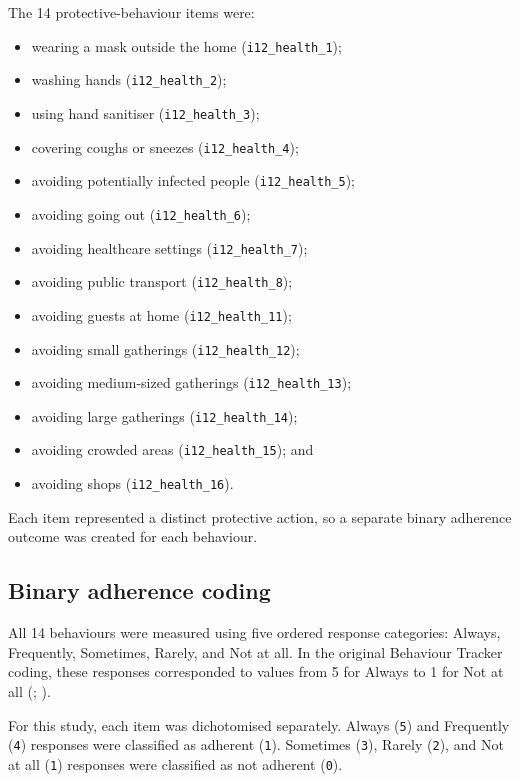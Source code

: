 \documentclass[
  12pt,
  a4paper,
]{article}
\providecommand{\tightlist}{%
  \setlength{\itemsep}{0pt}\setlength{\parskip}{0pt}}
\begin{document}
The 14 protective-behaviour items were:

\begin{itemize}
\tightlist
\item
  wearing a mask outside the home (\texttt{i12\_health\_1});
\item
  washing hands (\texttt{i12\_health\_2});
\item
  using hand sanitiser (\texttt{i12\_health\_3});
\item
  covering coughs or sneezes (\texttt{i12\_health\_4});
\item
  avoiding potentially infected people (\texttt{i12\_health\_5});
\item
  avoiding going out (\texttt{i12\_health\_6});
\item
  avoiding healthcare settings (\texttt{i12\_health\_7});
\item
  avoiding public transport (\texttt{i12\_health\_8});
\item
  avoiding guests at home (\texttt{i12\_health\_11});
\item
  avoiding small gatherings (\texttt{i12\_health\_12});
\item
  avoiding medium-sized gatherings (\texttt{i12\_health\_13});
\item
  avoiding large gatherings (\texttt{i12\_health\_14});
\item
  avoiding crowded areas (\texttt{i12\_health\_15}); and
\item
  avoiding shops (\texttt{i12\_health\_16}).
\end{itemize}

Each item represented a distinct protective action, so a separate binary
adherence outcome was created for each behaviour.

\subsection{Binary adherence coding}\label{binary-adherence-coding}

All 14 behaviours were measured using five ordered response categories:
Always, Frequently, Sometimes, Rarely, and Not at all. In the original
Behaviour Tracker coding, these responses corresponded to values from 5
for Always to 1 for Not at all (; ).

For this study, each item was dichotomised separately. Always (\texttt{5}) and
Frequently (\texttt{4}) responses were classified as adherent (\texttt{1}). Sometimes
(\texttt{3}), Rarely (\texttt{2}), and Not at all (\texttt{1}) responses were classified as
not adherent (\texttt{0}).
\end{document}

